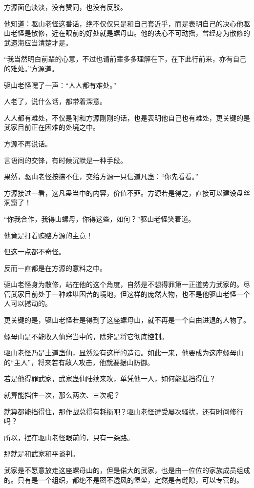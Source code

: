 \begin{this_body}
方源面色淡淡，没有赞同，也没有反驳。

他知道：驱山老怪这番话，绝不仅仅只是和自己套近乎，而是表明自己的决心他驱山老怪是散修，近在眼前的好处就是螺母山。他的决心不可动摇，曾经身为散修的武遗海应当清楚才是。

“我当然明白前辈的心意，不过也请前辈多多理解在下，在下此行前来，亦有自己的难处。”方源道。

驱山老怪嘿了一声：“人人都有难处。”

人老了，说什么话，都带着深意。

人人都有难处，不仅是附和方源刚刚的话，也是表明他自己也有难处，更关键的是武家目前正在困难的处境之中。

方源不再说话。

言语间的交锋，有时候沉默是一种手段。

果然，驱山老怪按捺不住，交给方源一只信道凡蛊：“你先看看。”

方源接过一看，这凡蛊当中的内容，价值不菲。方源若是得之，直接可以建设盘丝洞窟了！

“你我合作，我得山螺母，你得这些，如何？”驱山老怪笑着道。

他竟是打着贿赂方源的主意！

但这一点都不奇怪。

反而一直都是在方源的意料之中。

驱山老怪身为散修，站在他的这个角度，自然是不想得罪第一正道势力武家的。尽管武家目前处于一种难堪困苦的境地，但这样的庞然大物，也不是他驱山老怪一个人可以撼动的。

更关键的是，驱山老怪若是得到了这座螺母山，就不再是一个自由进退的人物了。

螺母山是不能收入仙窍当中的，除非是将它彻底控制。

驱山老怪乃是土道蛊仙，显然没有这样的造诣。如此一来，他要成为这座螺母山的“主人”，将来若有敌人攻击，他就要据山防御。

若是他得罪武家，武家蛊仙陆续来攻，单凭他一人，如何能抵挡得住？

就算能挡住一次，那么两次、三次呢？

就算都能挡得住，那作战总得有耗损吧？驱山老怪遭受屡次骚扰，还有时间修行吗？

所以，摆在驱山老怪眼前的，只有一条路。

那就是和武家和平谈判。

武家是不愿意放走这座螺母山的，但是偌大的武家，也是由一位位的家族成员组成的。只有是一个组织，都绝不是密不透风的堡垒，定然是有缝隙，可以专营的。


\end{this_body}
